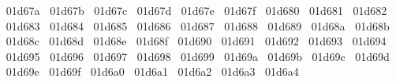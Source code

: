 {  ^^^^^^01d67a%
  ^^^^^^01d67b%
  ^^^^^^01d67c%
  ^^^^^^01d67d%
  ^^^^^^01d67e%
  ^^^^^^01d67f%
  ^^^^^^01d680%
  ^^^^^^01d681%
  ^^^^^^01d682%
  ^^^^^^01d683%
  ^^^^^^01d684%
  ^^^^^^01d685%
  ^^^^^^01d686%
  ^^^^^^01d687%
  ^^^^^^01d688%
  ^^^^^^01d689%
  ^^^^^^01d68a%
  ^^^^^^01d68b%
  ^^^^^^01d68c%
  ^^^^^^01d68d%
  ^^^^^^01d68e%
  ^^^^^^01d68f%
  ^^^^^^01d690%
  ^^^^^^01d691%
  ^^^^^^01d692%
  ^^^^^^01d693%
  ^^^^^^01d694%
  ^^^^^^01d695%
  ^^^^^^01d696%
  ^^^^^^01d697%
  ^^^^^^01d698%
  ^^^^^^01d699%
  ^^^^^^01d69a%
  ^^^^^^01d69b%
  ^^^^^^01d69c%
  ^^^^^^01d69d%
  ^^^^^^01d69e%
  ^^^^^^01d69f%
  ^^^^^^01d6a0%
  ^^^^^^01d6a1%
  ^^^^^^01d6a2%
  ^^^^^^01d6a3%
  ^^^^^^01d6a4%
}
